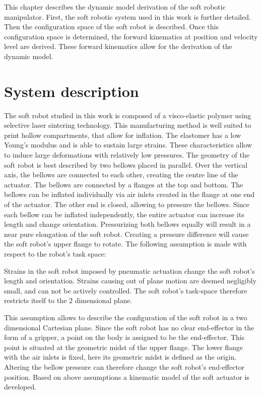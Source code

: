 \label{chap2}

This chapter describes the dynamic model derivation of the soft robotic manipulator. First, the soft robotic system used in this work is further detailed. Then the configuration space of the soft robot is described. Once this configuration space is determined, the forward kinematics at position and velocity level are derived. These forward kinematics allow for the derivation of the dynamic model. 



\section{System description}

The soft robot studied in this work is composed of a visco-elastic polymer using selective laser sintering technology. This manufacturing method is well suited to print hollow compartments, that allow for inflation. The elastomer has a low Young's modulus and is able to sustain large strains. These characteristics allow to induce large deformations with relatively low pressures. The geometry of the soft robot is best described by two bellows placed in parallel. Over the vertical axis, the bellows are connected to each other, creating the centre line of the actuator. The bellows are connected by a flanges at the top and bottom. The bellows can be inflated individually via air inlets created in the flange at one end of the actuator. The other end is closed, allowing to pressure the bellows. Since each bellow can be inflated independently, the entire actuator can increase its length and change orientation. Pressurizing both bellows equally will result in a near pure elongation of the soft robot. Creating a pressure difference will cause the soft robot's upper flange to rotate. The following assumption is made with respect to the robot's task space:

\begin{theorem}
Strains in the soft robot imposed by pneumatic actuation change the soft robot's length and orientation. Strains causing out of plane motion are deemed negligibly small, and can not be actively controlled. The soft robot's task-space therefore restricts itself to the 2 dimensional plane.
\end{theorem}

This assumption allows to describe the configuration of the soft robot in a two dimensional Cartesian plane. Since the soft robot has no clear end-effector in the form of a gripper, a point on the body is assigned to be the end-effector. This point is situated at the geometric midst of the upper flange. The lower flange with the air inlets is fixed, here its geometric midst is defined as the origin. Altering the bellow pressure can therefore change the soft robot's end-effector position. Based on above assumptions a kinematic model of the soft actuator is developed. 


